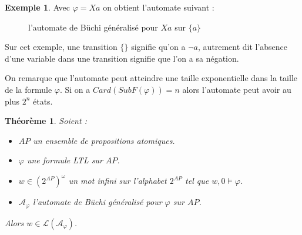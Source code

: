 \documentclass[12pt,a4paper]{article}
\theoremstyle{plain}
\newtheorem{thm}{Théorème}
\theoremstyle{definition}
\newtheorem{ex}{Exemple}
\begin{document}
\newpage
\begin{ex}
  Avec $\varphi = Xa$ on obtient l'automate suivant :
  \begin{figure}[h]
    \centering
    \caption{l'automate de Büchi généralisé pour $Xa$ sur $\{a\}$}
  \end{figure}
  
  Sur cet exemple, une transition $\{\}$ signifie qu'on a $\lnot a$, autrement dit l'absence d'une variable dans une transition signifie que l'on a sa négation.
\end{ex}

On remarque que l'automate peut atteindre une taille exponentielle dans la taille de la formule $\varphi$.
Si on a $Card(SubF(\varphi)) = n$ alors l'automate peut avoir au plus $2^n$ états.

\begin{thm}
  Soient :
  \begin{itemize}
  \item $AP$ un ensemble de propositions atomiques.
  \item $\varphi$ une formule LTL sur $AP$.
  \item $w \in (2^{AP})^\omega$ un mot infini sur l'alphabet $2^{AP}$ tel que $w, 0 \models \varphi$.
  \item $\mathcal{A}_\varphi$ l'automate de Büchi généralisé pour $\varphi$ sur $AP$.
  \end{itemize}
  Alors $w \in \mathcal{L}(\mathcal{A}_\varphi)$. 
\end{thm}
\end{document}

